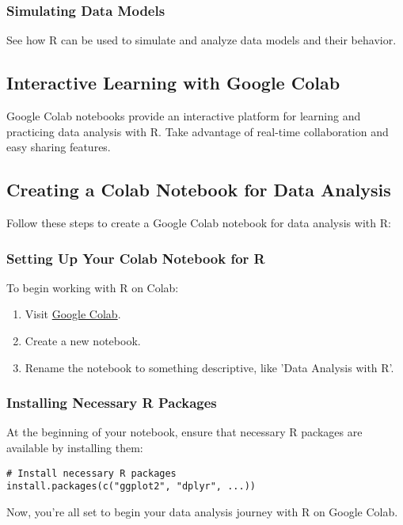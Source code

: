 \documentclass[a4paper,12pt]{book}
\begin{document}
\subsubsection*{Simulating Data Models}
See how R can be used to simulate and analyze data models and their behavior.

\subsection*{Interactive Learning with Google Colab}

Google Colab notebooks provide an interactive platform for learning and practicing data analysis with R. Take advantage of real-time collaboration and easy sharing features.

\subsection*{Creating a Colab Notebook for Data Analysis}

Follow these steps to create a Google Colab notebook for data analysis with R:

\subsubsection*{Setting Up Your Colab Notebook for R}
To begin working with R on Colab:

\begin{enumerate}
    \item Visit \href{https://colab.research.google.com/}{Google Colab}.
    \item Create a new notebook.
    \item Rename the notebook to something descriptive, like 'Data Analysis with R'.
\end{enumerate}

\subsubsection*{Installing Necessary R Packages}
At the beginning of your notebook, ensure that necessary R packages are available by installing them:

\begin{verbatim}
# Install necessary R packages
install.packages(c("ggplot2", "dplyr", ...))
\end{verbatim}

Now, you're all set to begin your data analysis journey with R on Google Colab.



\cleardoublepage %
\printbibliography
\end{document}
